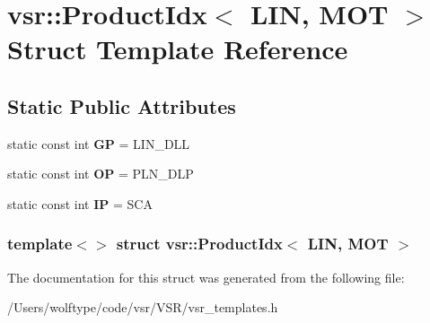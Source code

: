 \hypertarget{structvsr_1_1_product_idx_3_01_l_i_n_00_01_m_o_t_01_4}{\section{vsr\-:\-:Product\-Idx$<$ L\-I\-N, M\-O\-T $>$ Struct Template Reference}
\label{structvsr_1_1_product_idx_3_01_l_i_n_00_01_m_o_t_01_4}
}
\subsection*{Static Public Attributes}
\begin{DoxyCompactItemize}
\item 
\hypertarget{structvsr_1_1_product_idx_3_01_l_i_n_00_01_m_o_t_01_4_a10fb4263f58f3543f724d641646e13fb}{static const int {\bfseries G\-P} = L\-I\-N\-\_\-\-D\-L\-L}\label{structvsr_1_1_product_idx_3_01_l_i_n_00_01_m_o_t_01_4_a10fb4263f58f3543f724d641646e13fb}

\item 
\hypertarget{structvsr_1_1_product_idx_3_01_l_i_n_00_01_m_o_t_01_4_a2357a5f76887de075c2e322c2004cd75}{static const int {\bfseries O\-P} = P\-L\-N\-\_\-\-D\-L\-P}\label{structvsr_1_1_product_idx_3_01_l_i_n_00_01_m_o_t_01_4_a2357a5f76887de075c2e322c2004cd75}

\item 
\hypertarget{structvsr_1_1_product_idx_3_01_l_i_n_00_01_m_o_t_01_4_aad1a09c954eaf74785afa61c08d7c5c1}{static const int {\bfseries I\-P} = S\-C\-A}\label{structvsr_1_1_product_idx_3_01_l_i_n_00_01_m_o_t_01_4_aad1a09c954eaf74785afa61c08d7c5c1}

\end{DoxyCompactItemize}
\subsubsection*{template$<$$>$ struct vsr\-::\-Product\-Idx$<$ L\-I\-N, M\-O\-T $>$}



The documentation for this struct was generated from the following file\-:\begin{DoxyCompactItemize}
\item 
/\-Users/wolftype/code/vsr/\-V\-S\-R/vsr\-\_\-templates.\-h\end{DoxyCompactItemize}
